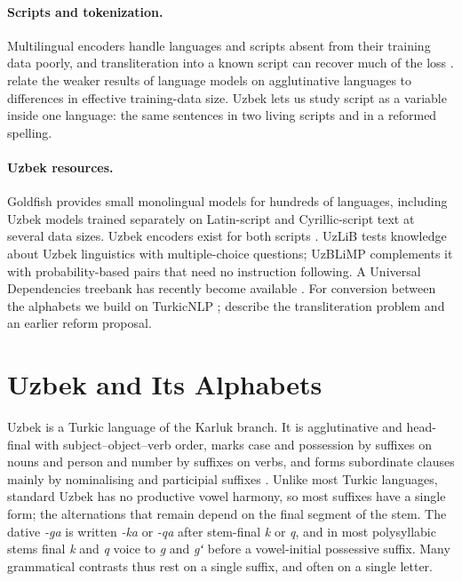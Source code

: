\documentclass[11pt]{article}
\newcommand{\uz}[1]{\textit{#1}}
\begin{document}
\paragraph{Scripts and tokenization.} Multilingual encoders handle languages and scripts absent from their training data poorly, and transliteration into a known script can recover much of the loss \citep{muller-etal-2021-unseen,pfeiffer-etal-2021-unks}. \citet{arnett-bergen-2025-language} relate the weaker results of language models on agglutinative languages to differences in effective training-data size. Uzbek lets us study script as a variable inside one language: the same sentences in two living scripts and in a reformed spelling.

\paragraph{Uzbek resources.} Goldfish \citep{chang2024goldfish} provides small monolingual models for hundreds of languages, including Uzbek models trained separately on Latin-script and Cyrillic-script text at several data sizes. Uzbek encoders exist for both scripts \citep{mansurov2021uzbert,kuriyozov-etal-2024-bertbek,mamasaidov2023tahrirchibert,adilova2022uzroberta}. UzLiB \citep{shopulatov2025uzlib} tests knowledge about Uzbek linguistics with multiple-choice questions; UzBLiMP complements it with probability-based pairs that need no instruction following. A Universal Dependencies treebank has recently become available \citep{matlatipov-etal-2026-uzudt}. For conversion between the alphabets we build on TurkicNLP \citep{hakimov2026turkicnlp}; \citet{salaev-etal-2022-transliteration} describe the transliteration problem and an earlier reform proposal.

\section{Uzbek and Its Alphabets}
\label{sec:uzbek}

Uzbek is a Turkic language of the Karluk branch. It is agglutinative and head-final with subject--object--verb order, marks case and possession by suffixes on nouns and person and number by suffixes on verbs, and forms subordinate clauses mainly by nominalising and participial suffixes \citep{sjoberg1963,boeschoten1998uzbek,bodrogligeti2003}. Unlike most Turkic languages, standard Uzbek has no productive vowel harmony, so most suffixes have a single form; the alternations that remain depend on the final segment of the stem. The dative \uz{-ga} is written \uz{-ka} or \uz{-qa} after stem-final \uz{k} or \uz{q}, and in most polysyllabic stems final \uz{k} and \uz{q} voice to \uz{g} and \uz{gʻ} before a vowel-initial possessive suffix. Many grammatical contrasts thus rest on a single suffix, and often on a single letter.
\end{document}
